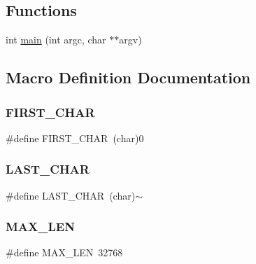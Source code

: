 \subsection*{Functions}
\begin{DoxyCompactItemize}
\item 
int \mbox{\hyperlink{adat-devel_2other__libs_2filedb_2filehash_2replaceStrings_8c_a3c04138a5bfe5d72780bb7e82a18e627}{main}} (int argc, char $\ast$$\ast$argv)
\end{DoxyCompactItemize}


\subsection{Macro Definition Documentation}
\mbox{\label{adat-devel_2other__libs_2filedb_2filehash_2replaceStrings_8c_af1c5fd90d1b8a22169133f549223f2e1}} 
\subsubsection{\texorpdfstring{FIRST\_CHAR}{FIRST\_CHAR}}
{\footnotesize\ttfamily \#define F\+I\+R\+S\+T\+\_\+\+C\+H\+AR~(char)\textquotesingle{}0\textquotesingle{}}

\mbox{\label{adat-devel_2other__libs_2filedb_2filehash_2replaceStrings_8c_a31911f021a0d09eed9a5269d0648dfde}} 
\subsubsection{\texorpdfstring{LAST\_CHAR}{LAST\_CHAR}}
{\footnotesize\ttfamily \#define L\+A\+S\+T\+\_\+\+C\+H\+AR~(char)\textquotesingle{}$\sim$\textquotesingle{}}

\mbox{\label{adat-devel_2other__libs_2filedb_2filehash_2replaceStrings_8c_aabf4f709c8199e41cf279c77112345fe}} 
\subsubsection{\texorpdfstring{MAX\_LEN}{MAX\_LEN}}
{\footnotesize\ttfamily \#define M\+A\+X\+\_\+\+L\+EN~32768}

